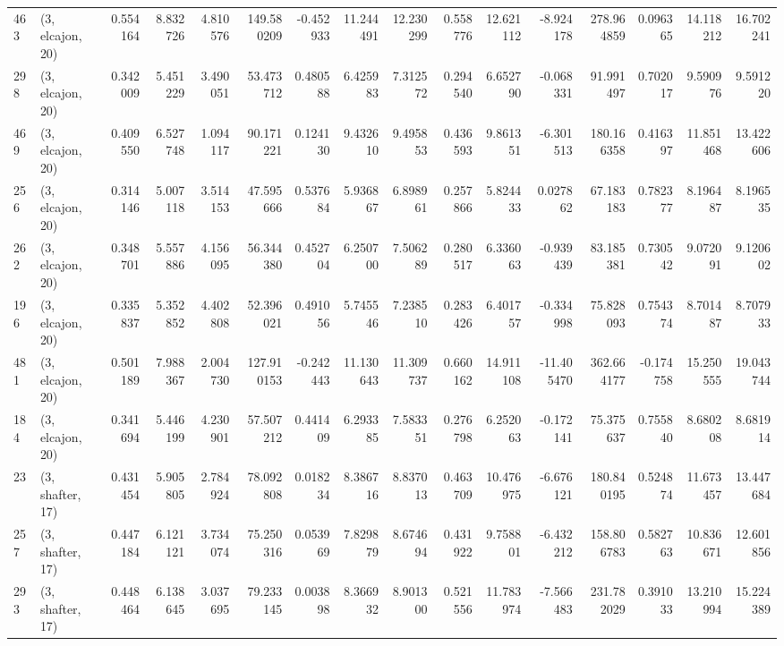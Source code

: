 \begin{tabular}{llrrrrrrrrrrrrrr}
463 &  (3, elcajon, 20) &   0.554164 &   8.832726 &   4.810576 &   149.580209 &  -0.452933 &  11.244491 &  12.230299 &  0.558776 &  12.621112 &  -8.924178 &   278.964859 &   0.096365 &  14.118212 &  16.702241 \\
298 &  (3, elcajon, 20) &   0.342009 &   5.451229 &   3.490051 &    53.473712 &   0.480588 &   6.425983 &   7.312572 &  0.294540 &   6.652790 &  -0.068331 &    91.991497 &   0.702017 &   9.590976 &   9.591220 \\
469 &  (3, elcajon, 20) &   0.409550 &   6.527748 &   1.094117 &    90.171221 &   0.124130 &   9.432610 &   9.495853 &  0.436593 &   9.861351 &  -6.301513 &   180.166358 &   0.416397 &  11.851468 &  13.422606 \\
256 &  (3, elcajon, 20) &   0.314146 &   5.007118 &   3.514153 &    47.595666 &   0.537684 &   5.936867 &   6.898961 &  0.257866 &   5.824433 &   0.027862 &    67.183183 &   0.782377 &   8.196487 &   8.196535 \\
262 &  (3, elcajon, 20) &   0.348701 &   5.557886 &   4.156095 &    56.344380 &   0.452704 &   6.250700 &   7.506289 &  0.280517 &   6.336063 &  -0.939439 &    83.185381 &   0.730542 &   9.072091 &   9.120602 \\
196 &  (3, elcajon, 20) &   0.335837 &   5.352852 &   4.402808 &    52.396021 &   0.491056 &   5.745546 &   7.238510 &  0.283426 &   6.401757 &  -0.334998 &    75.828093 &   0.754374 &   8.701487 &   8.707933 \\
481 &  (3, elcajon, 20) &   0.501189 &   7.988367 &   2.004730 &   127.910153 &  -0.242443 &  11.130643 &  11.309737 &  0.660162 &  14.911108 & -11.405470 &   362.664177 &  -0.174758 &  15.250555 &  19.043744 \\
184 &  (3, elcajon, 20) &   0.341694 &   5.446199 &   4.230901 &    57.507212 &   0.441409 &   6.293385 &   7.583351 &  0.276798 &   6.252063 &  -0.172141 &    75.375637 &   0.755840 &   8.680208 &   8.681914 \\
23  &  (3, shafter, 17) &   0.431454 &   5.905805 &   2.784924 &    78.092808 &   0.018234 &   8.386716 &   8.837013 &  0.463709 &  10.476975 &  -6.676121 &   180.840195 &   0.524874 &  11.673457 &  13.447684 \\
257 &  (3, shafter, 17) &   0.447184 &   6.121121 &   3.734074 &    75.250316 &   0.053969 &   7.829879 &   8.674694 &  0.431922 &   9.758801 &  -6.432212 &   158.806783 &   0.582763 &  10.836671 &  12.601856 \\
293 &  (3, shafter, 17) &   0.448464 &   6.138645 &   3.037695 &    79.233145 &   0.003898 &   8.366932 &   8.901300 &  0.521556 &  11.783974 &  -7.566483 &   231.782029 &   0.391033 &  13.210994 &  15.224389 \\

\end{tabular}
